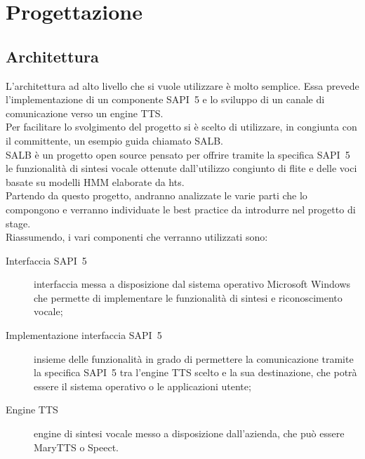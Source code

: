\chapter{Progettazione} %
\thispagestyle{empty}

\newpage
\section{Architettura}
L'architettura ad alto livello che si vuole utilizzare è molto semplice. Essa prevede l'implementazione di un componente SAPI~5 e lo sviluppo di un canale di comunicazione verso un engine TTS.\\
Per facilitare lo svolgimento del progetto si è scelto di utilizzare, in congiunta con il committente, un esempio guida chiamato SALB.\\
SALB è un progetto open source pensato per offrire tramite la specifica SAPI~5 le funzionalità di sintesi vocale ottenute dall'utilizzo congiunto di flite e delle voci basate su modelli HMM elaborate da \gls{hts}.\\
Partendo da questo progetto, andranno analizzate le varie parti che lo compongono e verranno individuate le best practice da introdurre nel progetto di stage.\\
Riassumendo, i vari componenti che verranno utilizzati sono:
\begin{description}
	\item[Interfaccia SAPI~5] interfaccia messa a disposizione dal sistema operativo Microsoft Windows che permette di implementare le funzionalità di sintesi e riconoscimento vocale;
	\item[Implementazione interfaccia SAPI~5] insieme delle funzionalità in grado di permettere la comunicazione tramite la specifica SAPI~5 tra l'engine TTS scelto e la sua destinazione, che potrà essere il sistema operativo o le applicazioni utente; 
	\item[Engine TTS] engine di sintesi vocale messo a disposizione dall'azienda, che può essere MaryTTS o Speect.
\end{description}
	
	
	